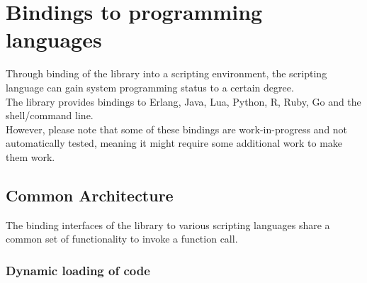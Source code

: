 %
%
%
%

\clearpage
\section{Bindings to programming languages}

Through binding of the  library into a scripting environment,
the scripting language can gain system programming status to a certain degree.\\
The  library provides bindings to Erlang\cite{Erlang}, Java\cite{Java},
Lua\cite{Lua}, Python\cite{Python}, R\cite{R}, Ruby\cite{Ruby}, Go\cite{Go} and the shell/command line.\\
However, please note that some of these bindings are work-in-progress and not
automatically tested, meaning it might require some additional work to make them
work.

\subsection{Common Architecture}

The binding interfaces of the  library to various scripting
languages share a common set of functionality to invoke a function call.

\subsubsection{Dynamic loading of code}

